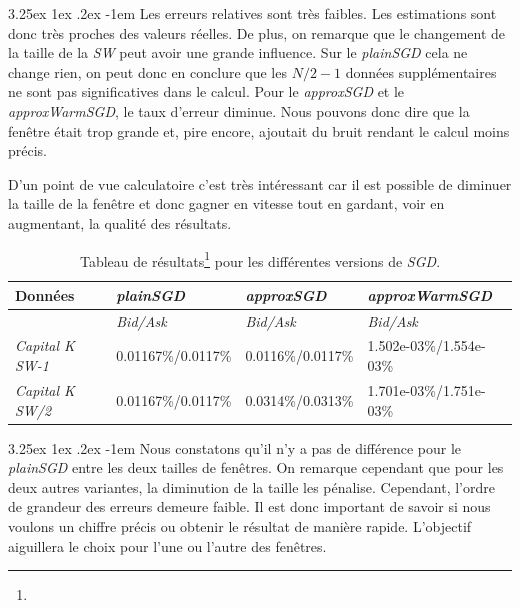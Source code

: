 \documentclass[a4paper, 11pt]{article}
\makeatletter
\renewcommand\paragraph{\@startsection{paragraph}{5}{\z@}%
  {3.25ex \@plus1ex \@minus.2ex}%
  {-1em}%
  {\normalfont\normalsize\bfseries}}
\makeatother
\begin{document}
 \addtocounter{footnote}{-2} %



\paragraph{}
Les erreurs relatives sont très faibles. Les estimations sont donc très proches des valeurs réelles. De plus, on remarque que le  changement de la taille de la \textit{SW} peut avoir une grande influence. Sur le \textit{plainSGD} cela ne change rien, on peut donc en conclure que les $N/2 - 1$ données supplémentaires ne sont pas significatives dans le calcul. Pour le \textit{approxSGD} et le \textit{approxWarmSGD}, le taux d'erreur diminue. Nous pouvons donc dire que la fenêtre était trop grande et, pire encore, ajoutait du bruit rendant le calcul moins précis.

D'un point de vue calculatoire c'est très intéressant car il est possible de diminuer la taille de la fenêtre et donc gagner en vitesse tout en gardant, voir en augmentant, la qualité des résultats.


\begin{table}[H]
	\centering
\begin{tabular}{|l|l|l|l|}
	\hline
	Données & \textit{plainSGD} & \textit{approxSGD} & \textit{approxWarmSGD}\\
	\hline
	\ & \textit{Bid/Ask} & \textit{Bid/Ask} & \textit{Bid/Ask} \\
	\hline
	\textit{Capital K SW-1} & 0.01167\%/0.0117\% & 0.0116\%/0.0117\% & 1.502e-03\%/1.554e-03\% \\
	\hline
	\textit{Capital K SW/2} & 0.01167\%/0.0117\% & 0.0314\%/0.0313\% & 1.701e-03\%/1.751e-03\%\\
	\hline

\end{tabular}
\caption[]{Tableau de résultats\footnote{} pour les différentes versions de \textit{SGD}.}
\end{table}


\paragraph{}
Nous constatons qu'il n'y a pas de différence pour le \textit{plainSGD} entre les deux tailles de fenêtres. On remarque cependant que pour les deux autres variantes, la diminution de la taille les pénalise. Cependant, l'ordre de grandeur des erreurs demeure faible. Il est donc important de savoir si nous voulons un chiffre précis ou obtenir le résultat de manière rapide. L'objectif aiguillera le choix pour l'une ou l'autre des fenêtres.
\end{document}
